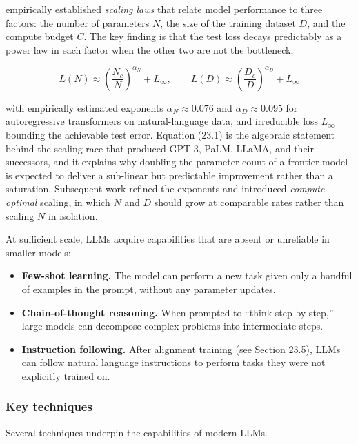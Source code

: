 \cite{kaplan2020scaling} empirically established \textit{scaling laws} that relate model performance to three factors: the number of parameters $N$, the size of the training dataset $D$, and the compute budget $C$. The key finding is that the test loss decays predictably as a power law in each factor when the other two are not the bottleneck,

\begin{equation}
L(N) \approx \left(\frac{N_c}{N}\right)^{\alpha_N} + L_\infty, \qquad L(D) \approx \left(\frac{D_c}{D}\right)^{\alpha_D} + L_\infty
\tag{23.1}
\end{equation}

with empirically estimated exponents $\alpha_N \approx 0.076$ and $\alpha_D \approx 0.095$ for autoregressive transformers on natural-language data, and irreducible loss $L_\infty$ bounding the achievable test error. Equation (23.1) is the algebraic statement behind the scaling race that produced GPT-3, PaLM, LLaMA, and their successors, and it explains why doubling the parameter count of a frontier model is expected to deliver a sub-linear but predictable improvement rather than a saturation. Subsequent work refined the exponents and introduced \textit{compute-optimal} scaling, in which $N$ and $D$ should grow at comparable rates rather than scaling $N$ in isolation.

At sufficient scale, LLMs acquire capabilities that are absent or unreliable in smaller models:

\begin{itemize}
\item \textbf{Few-shot learning.} The model can perform a new task given only a handful of examples in the prompt, without any parameter updates.
\item \textbf{Chain-of-thought reasoning.} When prompted to ``think step by step,'' large models can decompose complex problems into intermediate steps.
\item \textbf{Instruction following.} After alignment training (see Section 23.5), LLMs can follow natural language instructions to perform tasks they were not explicitly trained on.
\end{itemize}

\subsubsection{Key techniques}

Several techniques underpin the capabilities of modern LLMs.

